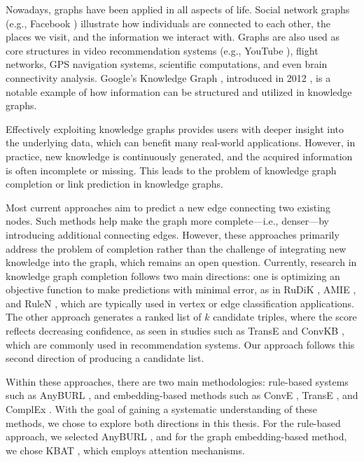 Nowadays, graphs have been applied in all aspects of life. Social network graphs (e.g., Facebook \cite{ugander2011anatomy}) illustrate how individuals are connected to each other, the places we visit, and the information we interact with. Graphs are also used as core structures in video recommendation systems (e.g., YouTube \cite{baluja2008video}), flight networks, GPS navigation systems, scientific computations, and even brain connectivity analysis. Google’s Knowledge Graph \cite{googlekg:2020}, introduced in 2012 \cite{ji2020survey}, is a notable example of how information can be structured and utilized in knowledge graphs.

Effectively exploiting knowledge graphs provides users with deeper insight into the underlying data, which can benefit many real-world applications. However, in practice, new knowledge is continuously generated, and the acquired information is often incomplete or missing. This leads to the problem of knowledge graph completion or link prediction in knowledge graphs.

Most current approaches aim to predict a new edge connecting two existing nodes. Such methods help make the graph more complete—i.e., denser—by introducing additional connecting edges. However, these approaches primarily address the problem of completion rather than the challenge of integrating new knowledge into the graph, which remains an open question. Currently, research in knowledge graph completion follows two main directions: one is optimizing an objective function to make predictions with minimal error, as in RuDiK \cite{ortona2018robust}, AMIE \cite{galarraga2015fast}, and RuleN \cite{meilicke2018fine}, which are typically used in vertex or edge classification applications. The other approach generates a ranked list of \(k\) candidate triples, where the score reflects decreasing confidence, as seen in studies such as TransE \cite{bordes2013translating} and ConvKB \cite{vu2019capsule}, which are commonly used in recommendation systems. Our approach follows this second direction of producing a candidate list.

Within these approaches, there are two main methodologies: rule-based systems such as AnyBURL \cite{burl}, and embedding-based methods such as ConvE \cite{dettmers2017convolutional}, TransE \cite{bordes2013translating}, and ComplEx \cite{trouillon2016complex}. With the goal of gaining a systematic understanding of these methods, we chose to explore both directions in this thesis. For the rule-based approach, we selected AnyBURL \cite{burl}, and for the graph embedding-based method, we chose KBAT \cite{nathani2019learning}, which employs attention mechanisms.

